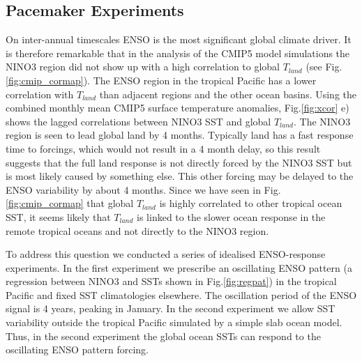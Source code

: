 \subsection{Pacemaker Experiments}


On inter-annual timescales ENSO is the most significant global climate driver. 
It is therefore remarkable that in the analysis of the CMIP5 model simulations 
the NINO3 region did not show up with a high correlation to global $T_{land}$ 
(see Fig.\ref{fig:cmip_cormap}). The ENSO region in the tropical Pacific has a 
lower correlation with $T_{land}$ than adjacent regions and the other ocean 
basins. Using the combined monthly mean CMIP5 surface temperature anomalies, 
Fig.\ref{fig:xcor} e) shows the lagged correlations between NINO3 SST and global 
$T_{land}$. The NINO3 region is seen to lead global land by 4 months.  Typically 
land has a fast response time to forcings, which would not result in a 
4 month delay, so this result suggests that the full land response is not 
directly forced by the NINO3 SST but is most likely caused by something else. 
This other forcing may be delayed to the ENSO variability by about 4 months. 
Since we have seen in Fig.\ref{fig:cmip_cormap} that global $T_{land}$ is highly 
correlated to other tropical ocean SST, it seems likely that $T_{land}$ is 
linked to the slower ocean response in the remote tropical oceans and not 
directly to the NINO3 region.

To address this question we conducted a series of idealised ENSO-response 
experiments. In the first experiment we prescribe an oscillating ENSO pattern (a 
regression between NINO3 and SSTs shown in Fig.\ref{fig:regpat}) in the tropical 
Pacific and fixed SST climatologies elsewhere.  The oscillation period of the 
ENSO signal is 4 years, peaking in January. In the second experiment we allow 
SST variability outside the tropical Pacific simulated by a simple slab ocean 
model.  Thus, in the second experiment the global ocean SSTs can respond to the 
oscillating ENSO pattern forcing.

